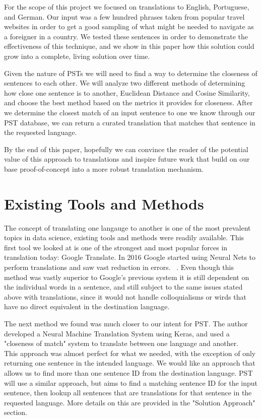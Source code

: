 \documentclass[runningheads]{llncs}
\begin{document}
	For the scope of this project we focused on translations to English, Portuguese, and German. Our input was a few hundred phrases taken from popular travel websites in order to get a good sampling of what might be needed to navigate as a foreigner in a country. We tested these sentences in order to demonstrate the effectiveness of this technique, and we show in this paper how this solution could grow into a complete, living solution over time. 

	Given the nature of PSTs we will need to find a way to determine the closeness of sentences to each other. We will analyze two different methods of determining how close one sentence is to another, Euclidean Distance and Cosine Similarity, and choose the best method based on the metrics it provides for closeness. After we determine the closest match of an input sentence to one we know through our PST database, we can return a curated translation that matches that sentence in the requested language.

	By the end of this paper, hopefully we can convince the reader of the potential value of this approach to translations and inspire future work that build on our base proof-of-concept into a more robust translation mechanism. 
	
	\section{Existing Tools and Methods}
	The concept of translating one langauge to another is one of the most prevalent topics in data science, existing tools and methods were readily available. This first tool we looked at is one of the strongest and most popular forces in translation today: Google Translate. In 2016 Google started using Neural Nets to perform translations and saw vast reduction in errors. ~\cite{ref_url18}. Even though this method was vastly superior to Google's previous system it is still dependent on the individual words in a sentence, and still subject to the same issues stated above with translations, since it would not handle colloquialisms or wirds that have no direct equivalent in the destination language. 

	The next method we found was much closer to our intent for PST. The author developed a Neural Machine Translation System using Keras, and used a "closeness of match" system to translate between one language and another.~\cite{ref_url16} This approach was almost perfect for what we needed, with the exception of only returning one sentence in the intended language. We would like an approach that allows us to find more than one sentence ID from the destination language. PST will use a similar approach, but aims to find a matching sentence ID for the input sentence, then lookup all sentences that are translations for that sentence in the requested language. More details on this are provided in the "Solution Approach" section.
	
\end{document}
